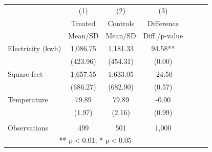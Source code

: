 {\def\sym#1{\ifmmode^{#1}\else\(^{#1}\)\fi} \begin{tabular}{l*{3}{cc}} \hline
                    &\multicolumn{1}{c}{(1)}&\multicolumn{1}{c}{(2)}&\multicolumn{1}{c}{(3)}\\
                    &\multicolumn{1}{c}{Treated}&\multicolumn{1}{c}{Controls}&\multicolumn{1}{c}{Difference}\\
                    &     Mean/SD&     Mean/SD&Diff./p-value  \\
\hline
Electricity (kwh)   &    1,086.75&    1,181.33&       94.58**\\
                    &    (423.96)&    (454.31)&      (0.00)  \\
Square feet         &    1,657.55&    1,633.05&      -24.50  \\
                    &    (686.27)&    (682.90)&      (0.57)  \\
Temperature         &       79.89&       79.89&       -0.00  \\
                    &      (1.97)&      (2.16)&      (0.99)  \\
 & & & \\
Observations        &         499&         501&       1,000  \\
\hline \multicolumn{4}{c}{ ** p$<$0.01, * p$<$0.05} \\ \end{tabular} }
